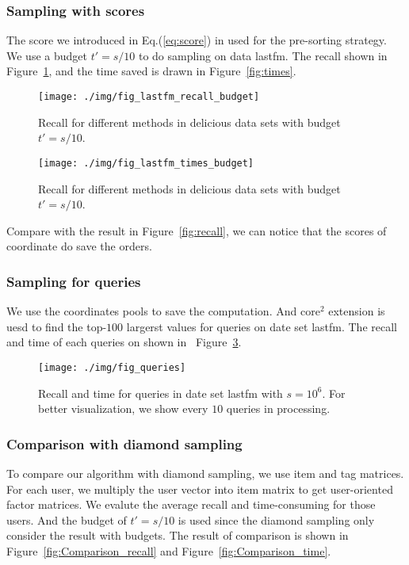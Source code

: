 \documentclass[letterpaper]{article}
\newcommand{\Eqn}[1]{Eq.(\ref{eq:#1})}
\newcommand{\Fig}[1]{Figure~\ref{fig:#1}}
\begin{document}
\subsubsection{Sampling with scores}
The score we introduced in \Eqn{score} in used for the pre-sorting strategy.
We use a budget $t' = s/10$ to do sampling on data lastfm.
The recall shown in \Fig{budget}, and the time saved is drawn in \Fig{times}.
\begin{figure}[ht]
  \centering
  \texttt{[image: ./img/fig\_lastfm\_recall\_budget]}\\
  \caption{Recall for different methods in delicious data sets with budget $t'=s/10$.}
  \label{fig:budget}
\end{figure}
\begin{figure}[ht]
  \centering
  \texttt{[image: ./img/fig\_lastfm\_times\_budget]}\\
  \caption{Recall for different methods in delicious data sets with budget $t'=s/10$.}
  \label{fig:time_budget}
\end{figure}
Compare with the result in \Fig{recall}, we can notice that the scores of coordinate
do save the orders.
\subsubsection{Sampling for queries}
We use the coordinates pools to save the computation.
And core$^2$ extension is uesd 
to find the top-$100$ largerst values for queries on date set lastfm.
The recall and time of each queries on shown in ~\Fig{Queries}.
\begin{figure}[ht]
  \centering
  \texttt{[image: ./img/fig\_queries]}\\
  \caption{Recall and time for queries in date set lastfm with $s=10^6$.
           For better visualization,
           we show every $10$ queries in processing.}
  \label{fig:Queries}
\end{figure}
\subsubsection{Comparison with diamond sampling}
To compare our algorithm with diamond sampling, we use item and tag matrices.
For each user, we multiply the user vector into item matrix
to get user-oriented factor matrices.
We evalute the average recall and time-consuming for those users.
And the budget of $t'=s/10$ is used since the diamond sampling only consider the result with budgets.
The result of comparison is shown in \Fig{Comparison_recall} and \Fig{Comparison_time}.
\end{document}
